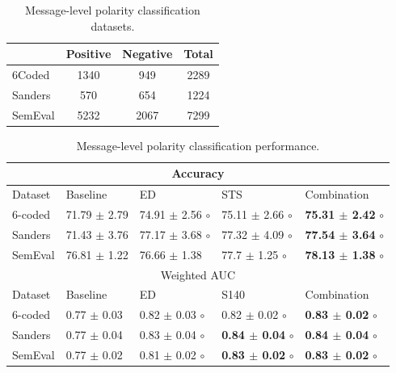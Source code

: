 \documentclass{sig-alternate}
\begin{document}
 \begin{table}[htbp]
\begin{center}
\begin{tabular}{l|c|c|c}
\hline
 & Positive & Negative & Total \\ \hline
6Coded & 1340 & 949 & 2289 \\ 
Sanders & 570 & 654 & 1224 \\ 
SemEval & 5232 & 2067 & 7299 \\ \hline
\end{tabular}
\end{center}
\caption{Message-level polarity classification datasets.}
\label{tab:polcorpus}
\end{table} 
  
\begin{table}[htbp]
\begin{center}
\begin{tabular}{l|l|l|l|l}
\hline \hline
\multicolumn{ 5}{c}{Accuracy } \\ \hline \hline
Dataset & Baseline & ED & STS & Combination \\ \hline
6-coded & 71.79 $\pm$ 2.79 & 74.91 $\pm$ 2.56 $\circ$ & 75.11 $\pm$ 2.66 $\circ$ &  \textbf{75.31 $\pm$ 2.42} $\circ$ \\ 
Sanders & 71.43 $\pm$ 3.76 & 77.17 $\pm$ 3.68 $\circ$ & 77.32 $\pm$ 4.09 $\circ$ &  \textbf{77.54 $\pm$ 3.64} $\circ$ \\ 
SemEval & 76.81 $\pm$ 1.22 & 76.66 $\pm$ 1.38 & 77.7 $\pm$ 1.25 $\circ$ & \textbf{78.13 $\pm$ 1.38} $\circ$ \\ \hline \hline
\multicolumn{ 5}{c}{Weighted AUC } \\ \hline \hline
Dataset & Baseline & ED & S140 & Combination \\ \hline
6-coded & 0.77 $\pm$ 0.03 & 0.82 $\pm$ 0.03 $\circ$ & 0.82 $\pm$ 0.02 $\circ$ &  \textbf{0.83 $\pm$ 0.02} $\circ$ \\ 
Sanders & 0.77 $\pm$ 0.04 & 0.83 $\pm$ 0.04 $\circ$ & \textbf{0.84 $\pm$ 0.04} $\circ$  & \textbf{0.84 $\pm$ 0.04} $\circ$ \\ 
SemEval & 0.77 $\pm$ 0.02 & 0.81 $\pm$ 0.02 $\circ$ & \textbf{0.83 $\pm$ 0.02} $\circ$ &  \textbf{0.83 $\pm$ 0.02} $\circ$ \\ \hline
\end{tabular}
\caption{Message-level polarity classification performance.}
\label{tab:messclass}
\end{center}
\end{table}
\end{document}
